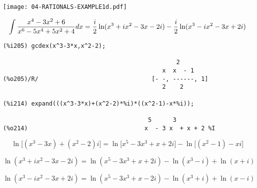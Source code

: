 \begin{center}
\texttt{[image: 04-RATIONALS-EXAMPLE1d.pdf]}
\end{center}

%

\vfill\eject

$$\int {{x^4-3x^2+6}\over{x^6-5x^4+5x^2+4}} dx =
   {i\over2}\ln(x^3+ix^2-3x-2i) - {i\over2}\ln(x^3-ix^2-3x+2i)$$

{\small\begin{verbatim}
(%i205) gcdex(x^3-3*x,x^2-2);

                                                 2
                                             x  x  - 1
(%o205)/R/                                [- -, ------, 1]
                                             2    2

(%i214) expand(((x^3-3*x)+(x^2-2)*%i)*((x^2-1)-x*%i));

                                         5      3
(%o214)                                 x  - 3 x  + x + 2 %I
\end{verbatim}}


$$\ln\Big[(x^3-3x)+(x^2-2)i\Big] = \ln\Big[x^5-3x^3+x+2i\Big] - \ln\Big[(x^2-1)-xi\Big]$$

$$\ln(x^3+ix^2-3x-2i) = \ln(x^5-3x^3+x+2i) - \ln(x^3-i) + \ln(x+i)$$

$$\ln(x^3-ix^2-3x+2i) = \ln(x^5-3x^3+x-2i) - \ln(x^3+i) + \ln(x-i)$$

